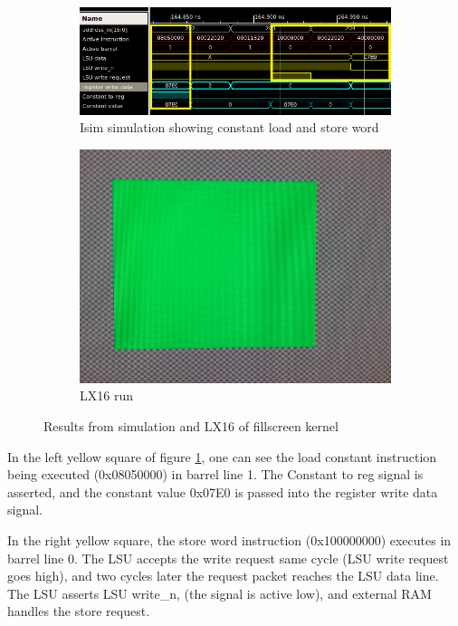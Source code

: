 \documentclass[../main/report.tex]{subfiles}
\begin{document}
\begin{figure}[H]
  \centering
  \begin{subfigure}[b]{\textwidth}
    \includegraphics[width=\textwidth]{../testing/assets/Constant_load_&_store.png}
    \caption{Isim simulation showing constant load and store word}
    \label{fig:isim-kernel-parameterization}
  \end{subfigure}
  \begin{subfigure}[b]{0.3\textwidth}
    \includegraphics[width=\textwidth]{../testing/assets/green_screen.jpg}
    \caption{LX16 run}
    \label{fig:LX16-kernel-parameterization}
  \end{subfigure}
  \caption{Results from simulation and LX16 of fillscreen kernel}
\end{figure}

In the left yellow square of figure \ref{fig:isim-kernel-parameterization}, one can see the load constant instruction being executed (0x08050000) in barrel line 1.
The Constant to reg signal is asserted, and the constant value 0x07E0 is passed into the register write data signal.

In the right yellow square, the store word instruction (0x100000000) executes in barrel line 0.
The LSU accepts the write request same cycle (LSU write request goes high), and two cycles later the request packet reaches the LSU data line.
The LSU asserts LSU write\_n, (the signal is active low), and external RAM handles the store request.
\end{document}
